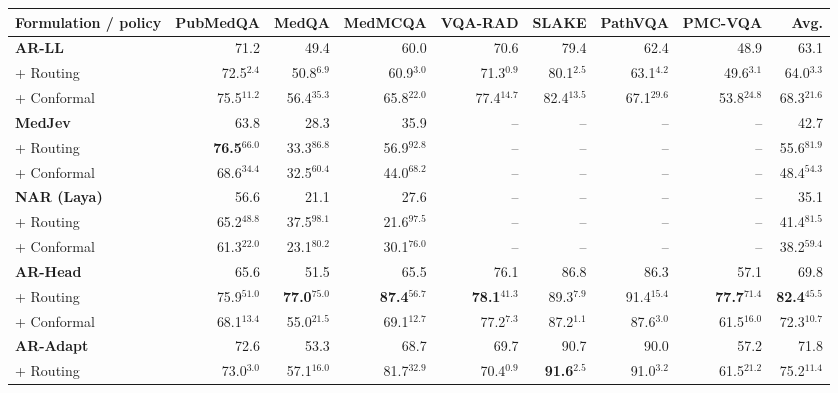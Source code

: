 \begin{table}[t]
\centering\scriptsize
\setlength{\tabcolsep}{3.2pt}
\renewcommand{\arraystretch}{1.20}
\begin{tabular*}{\textwidth}{@{\extracolsep{\fill}}lrrrrrrrr@{}}
\toprule
Formulation / policy & PubMedQA & MedQA & MedMCQA & VQA-RAD & SLAKE & PathVQA & PMC-VQA & Avg. \\
\midrule
\textbf{AR-LL} & 71.2 & 49.4 & 60.0 & 70.6 & 79.4 & 62.4 & 48.9 & 63.1 \\
\quad + Routing & 72.5$^{2.4}$ & 50.8$^{6.9}$ & 60.9$^{3.0}$ & 71.3$^{0.9}$ & 80.1$^{2.5}$ & 63.1$^{4.2}$ & 49.6$^{3.1}$ & 64.0$^{3.3}$ \\
\quad + Conformal & 75.5$^{11.2}$ & 56.4$^{35.3}$ & 65.8$^{22.0}$ & 77.4$^{14.7}$ & 82.4$^{13.5}$ & 67.1$^{29.6}$ & 53.8$^{24.8}$ & 68.3$^{21.6}$ \\
\addlinespace[3pt]
\textbf{MedJev} & 63.8 & 28.3 & 35.9 & -- & -- & -- & -- & 42.7 \\
\quad + Routing & \textbf{76.5}$^{66.0}$ & 33.3$^{86.8}$ & 56.9$^{92.8}$ & -- & -- & -- & -- & 55.6$^{81.9}$ \\
\quad + Conformal & 68.6$^{34.4}$ & 32.5$^{60.4}$ & 44.0$^{68.2}$ & -- & -- & -- & -- & 48.4$^{54.3}$ \\
\addlinespace[3pt]
\textbf{NAR (Laya)} & 56.6 & 21.1 & 27.6 & -- & -- & -- & -- & 35.1 \\
\quad + Routing & 65.2$^{48.8}$ & 37.5$^{98.1}$ & 21.6$^{97.5}$ & -- & -- & -- & -- & 41.4$^{81.5}$ \\
\quad + Conformal & 61.3$^{22.0}$ & 23.1$^{80.2}$ & 30.1$^{76.0}$ & -- & -- & -- & -- & 38.2$^{59.4}$ \\
\addlinespace[3pt]
\textbf{AR-Head} & 65.6 & 51.5 & 65.5 & 76.1 & 86.8 & 86.3 & 57.1 & 69.8 \\
\quad + Routing & 75.9$^{51.0}$ & \textbf{77.0}$^{75.0}$ & \textbf{87.4}$^{56.7}$ & \textbf{78.1}$^{41.3}$ & 89.3$^{7.9}$ & 91.4$^{15.4}$ & \textbf{77.7}$^{71.4}$ & \textbf{82.4}$^{45.5}$ \\
\quad + Conformal & 68.1$^{13.4}$ & 55.0$^{21.5}$ & 69.1$^{12.7}$ & 77.2$^{7.3}$ & 87.2$^{1.1}$ & 87.6$^{3.0}$ & 61.5$^{16.0}$ & 72.3$^{10.7}$ \\
\addlinespace[3pt]
\textbf{AR-Adapt} & 72.6 & 53.3 & 68.7 & 69.7 & 90.7 & 90.0 & 57.2 & 71.8 \\
\quad + Routing & 73.0$^{3.0}$ & 57.1$^{16.0}$ & 81.7$^{32.9}$ & 70.4$^{0.9}$ & \textbf{91.6}$^{2.5}$ & 91.0$^{3.2}$ & 61.5$^{21.2}$ & 75.2$^{11.4}$ \\

\end{tabular*}
\end{table}
